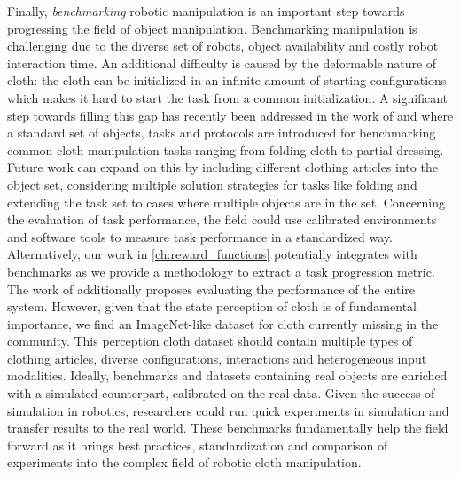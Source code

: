 \documentclass[\home/main.tex]{subfiles}
\begin{document}
Finally, \emph{benchmarking} robotic manipulation is an important step towards progressing the field of object manipulation. Benchmarking manipulation is challenging due to the diverse set of robots, object availability and costly robot interaction time. An additional difficulty is caused by the deformable nature of cloth: the cloth can be initialized in an infinite amount of starting configurations which makes it hard to start the task from a common initialization. A significant step towards filling this gap has recently been addressed in the work of \autocite{Camacho2020} and \textcite{garciacamacho2021household} where a standard set of objects, tasks and protocols are introduced for benchmarking common cloth manipulation tasks ranging from folding cloth to partial dressing. Future work can expand on this by including different clothing articles into the object set, considering multiple solution strategies for tasks like folding and extending the task set to cases where multiple objects are in the set. Concerning the evaluation of task performance, the field could use calibrated environments and software tools to measure task performance in a standardized way. Alternatively, our work in \cref{ch:reward_functions} potentially integrates with benchmarks as we provide a methodology to extract a task progression metric. The work of \textcite{Camacho2020} additionally proposes evaluating the performance of the entire system. However, given that the state perception of cloth is of fundamental importance, we find an ImageNet-like dataset for cloth currently missing in the community. This perception cloth dataset should contain multiple types of clothing articles, diverse configurations, interactions and heterogeneous input modalities.
Ideally, benchmarks and datasets containing real objects are enriched with a simulated counterpart, calibrated on the real data. Given the success of simulation in robotics, researchers could run quick experiments in simulation and transfer results to the real world.
These benchmarks fundamentally help the field forward as it brings best practices, standardization and comparison of experiments into the complex field of robotic cloth manipulation.

\end{document}
